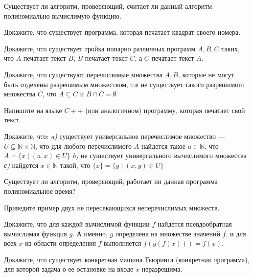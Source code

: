 \setcounter{curtask}{14}


\begin{task}
    Существует ли алгоритм, проверяющий, считает ли данный алгоритм
    полиномиально вычислимую функцию.
\end{task}

\begin{task}
    Докажите, что существует программа, которая печатает квадрат
    своего номера.
\end{task}

\begin{task}
    Докажите, что существует тройка попарно различных программ $A, B,
    C$ таких, что $A$ печатает текст $B$, $B$ печатает текст $C$, а
    $C$ печатает текст $A$.
\end{task}

\begin{task}
    Докажите, что существуют перечислимые множества $A, B$, которые не
    могут быть отделены разрешимым множеством, т.е не существует
    такого разрешимого множества $C$, что $A \subseteq C$ и $B \cap C
    = \emptyset$
\end{task}

\begin{task}
    Напишите на языке $C++$ (или аналогичном) программу, которая
    печатает свой текст.
\end{task}

\begin{task}
    Докажите, что: {\it a)} существует универсальное перечислимое множество ---
    $U \subseteq \mathbb{N} \times \mathbb{N}$, что для любого
    перечислимого $A$ найдется такое $a \in \mathbb{N}$, что $A = \{x
    \mid (a, x) \in U\}$
    {\it b)} не существует универсального вычислимого множества
    {\it с)} найдется $x \in \mathbb{N}$ такой, что $\{x\} = \{y
    \mid (x, y) \in U\}$
\end{task}

\breakline

\begin{ptask}{8}
    Существует ли алгоритм, проверяющий, работает ли данная программа
    полиномиальное время?
\end{ptask}

\begin{ptask}{9}
    Приведите пример двух не пересекающихся неперечислимых множеств.
\end{ptask}

\begin{ptask}{11}
    Докажите, что для каждой вычислимой функции $f$ найдется
    псевдообратная вычислимая функция $g$. А именно, $g$ определена на
    множестве значений $f$, и для всех $x$ из области определения $f$
    выполняется $f(g(f(x))) = f(x)$.
\end{ptask}

\begin{ptask}{13}
    Докажите, что существует конкретная машина Тьюринга (конкретная
    программа), для которой задача о ее остановке на входе $x$ неразрешима.
\end{ptask}